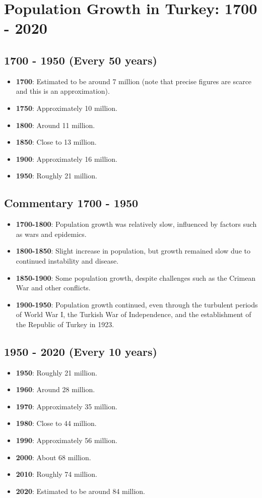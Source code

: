 \section*{Population Growth in Turkey: 1700 - 2020}

\subsection*{1700 - 1950 (Every 50 years)}
\begin{itemize}
    \item \textbf{1700}: Estimated to be around 7 million (note that precise figures are scarce and this is an approximation).
    \item \textbf{1750}: Approximately 10 million.
    \item \textbf{1800}: Around 11 million.
    \item \textbf{1850}: Close to 13 million.
    \item \textbf{1900}: Approximately 16 million.
    \item \textbf{1950}: Roughly 21 million.
\end{itemize}

\subsection*{Commentary 1700 - 1950}
\begin{itemize}
    \item \textbf{1700-1800}: Population growth was relatively slow, influenced by factors such as wars and epidemics.
    \item \textbf{1800-1850}: Slight increase in population, but growth remained slow due to continued instability and disease.
    \item \textbf{1850-1900}: Some population growth, despite challenges such as the Crimean War and other conflicts.
    \item \textbf{1900-1950}: Population growth continued, even through the turbulent periods of World War I, the Turkish War of Independence, and the establishment of the Republic of Turkey in 1923.
\end{itemize}

\subsection*{1950 - 2020 (Every 10 years)}
\begin{itemize}
    \item \textbf{1950}: Roughly 21 million.
    \item \textbf{1960}: Around 28 million.
    \item \textbf{1970}: Approximately 35 million.
    \item \textbf{1980}: Close to 44 million.
    \item \textbf{1990}: Approximately 56 million.
    \item \textbf{2000}: About 68 million.
    \item \textbf{2010}: Roughly 74 million.
    \item \textbf{2020}: Estimated to be around 84 million.
\end{itemize}

